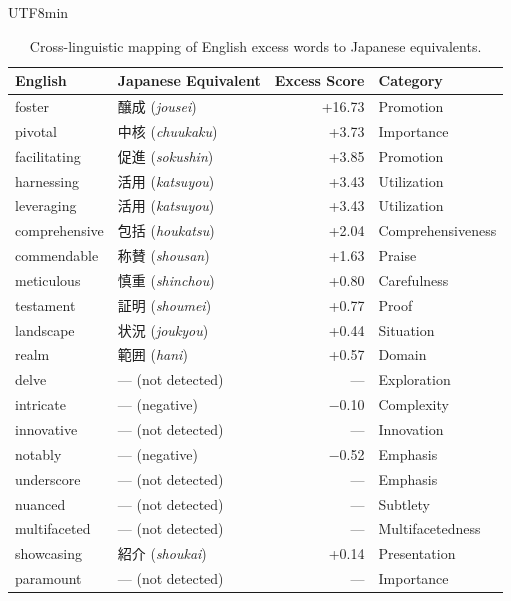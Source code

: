 \documentclass[11pt,a4paper]{article}
\begin{document}
\begin{CJK}{UTF8}{min}
\begin{table}[H]
\centering
\caption{Cross-linguistic mapping of English excess words to Japanese equivalents.}
\label{tab:crossling}
\small
\begin{tabular}{llrl}
\toprule
English & Japanese Equivalent & Excess Score & Category \\
\midrule
foster        & 醸成 (\textit{jousei})       & +16.73 & Promotion \\
pivotal       & 中核 (\textit{chuukaku})     & +3.73  & Importance \\
facilitating  & 促進 (\textit{sokushin})     & +3.85  & Promotion \\
harnessing    & 活用 (\textit{katsuyou})     & +3.43  & Utilization \\
leveraging    & 活用 (\textit{katsuyou})     & +3.43  & Utilization \\
comprehensive & 包括 (\textit{houkatsu})     & +2.04  & Comprehensiveness \\
commendable   & 称賛 (\textit{shousan})      & +1.63  & Praise \\
meticulous    & 慎重 (\textit{shinchou})     & +0.80  & Carefulness \\
testament     & 証明 (\textit{shoumei})      & +0.77  & Proof \\
landscape     & 状況 (\textit{joukyou})      & +0.44  & Situation \\
realm         & 範囲 (\textit{hani})         & +0.57  & Domain \\
\midrule
delve         & --- (not detected) & --- & Exploration \\
intricate     & --- (negative)     & $-$0.10 & Complexity \\
innovative    & --- (not detected) & --- & Innovation \\
notably       & --- (negative)     & $-$0.52 & Emphasis \\
underscore    & --- (not detected) & --- & Emphasis \\
nuanced       & --- (not detected) & --- & Subtlety \\
multifaceted  & --- (not detected) & --- & Multifacetedness \\
showcasing    & 紹介 (\textit{shoukai})     & +0.14  & Presentation \\
paramount     & --- (not detected) & --- & Importance \\
\bottomrule
\end{tabular}
\end{table}


\end{CJK}
\end{document}
